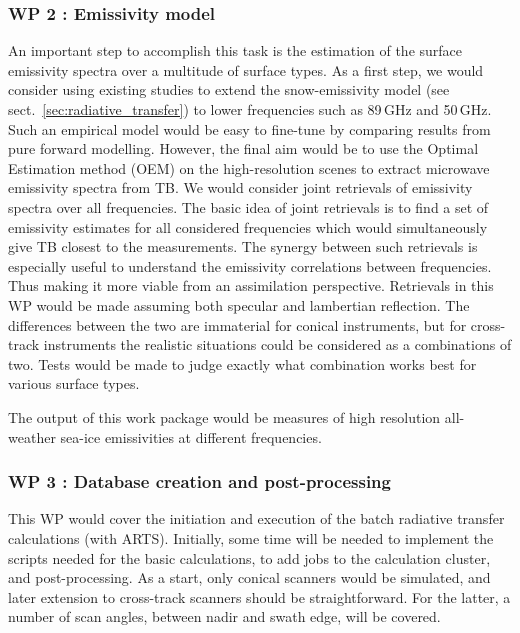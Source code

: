 \documentclass[12pt,oneside,a4paper]{article}
\begin{document}
\subsubsection*{WP 2 : Emissivity model}
%
\label{sec:emissivity}
An important step to accomplish this task is the estimation of the surface emissivity spectra over a multitude of surface types. As a first step, we would consider using existing studies to extend the snow-emissivity model (see sect.~\ref{sec:radiative_transfer}) to lower frequencies such as 89\,GHz and 50\,GHz. Such an empirical model would be easy to fine-tune by comparing results from pure forward modelling. However, the final aim would be to use the Optimal Estimation method (OEM) on the high-resolution scenes to extract microwave emissivity spectra from TB. We would consider joint retrievals of emissivity spectra over all frequencies. The basic idea of joint retrievals is to find a set of emissivity estimates for all considered frequencies which would simultaneously give TB closest to the measurements. The synergy between such retrievals is especially useful to understand the emissivity correlations between frequencies. Thus making it more viable from an assimilation perspective. Retrievals in this WP would be made assuming both specular and lambertian reflection. The differences between the two are immaterial for conical instruments, but for cross-track instruments the realistic situations could be considered as a combinations of two. Tests would be made to judge exactly what combination works best for various surface types. 


The output of this work package would be measures of high resolution all-weather sea-ice emissivities at different frequencies. 
	
\subsubsection*{WP 3 : Database creation and post-processing}
%
\label{sec:database}	
This WP would cover the initiation and execution of the batch radiative transfer calculations (with ARTS). Initially, some time will be needed to implement the scripts needed for the basic calculations, to add jobs to the calculation cluster, and post-processing. As a start, only conical scanners would be simulated, and later extension to cross-track scanners should be straightforward. For the latter, a number of scan angles, between nadir and swath edge, will be covered.
\end{document}
